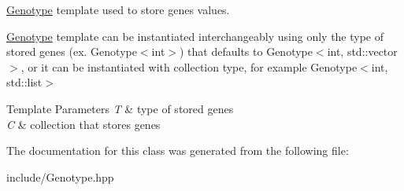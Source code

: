 \hyperlink{classGenotype}{Genotype} template used to store genes values.

\hyperlink{classGenotype}{Genotype} template can be instantiated interchangeably using only the type of stored genes (ex. Genotype$<$int$>$) that defaults to Genotype$<$int, std\+::vector$>$, or it can be instantiated with collection type, for example Genotype$<$int, std\+::list$>$


\begin{DoxyTemplParams}{Template Parameters}
{\em T} & type of stored genes \\
\hline
{\em C} & collection that stores genes \\
\hline
\end{DoxyTemplParams}


The documentation for this class was generated from the following file\+:\begin{DoxyCompactItemize}
\item 
include/Genotype.\+hpp\end{DoxyCompactItemize}
